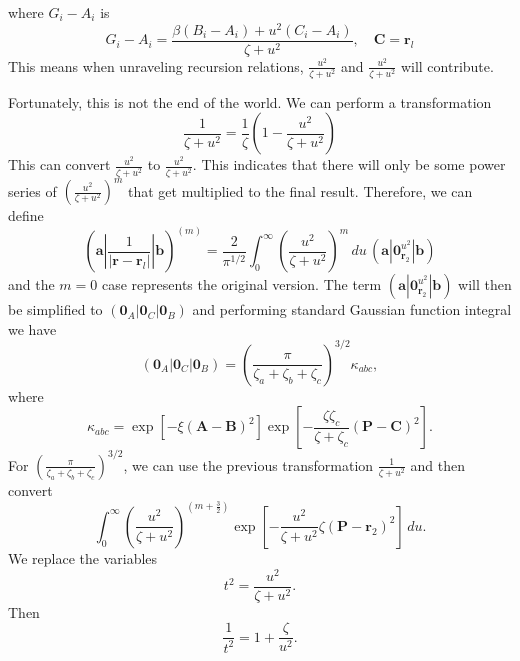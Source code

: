 \documentclass[12pt,a4paper,openany,twoside]{article}
\numberwithin{equation}{section}
\begin{document}
where $G_i-A_i$ is 
\begin{equation}
    G_i - A_i = \frac{\beta (B_i-A_i) + u^2 (C_i - A_i)}{\zeta + u^2}, \quad \boldsymbol{C} = \boldsymbol{r}_l
\end{equation}
This means when unraveling recursion relations, $\frac{u^2}{\zeta+u^2}$ and $\frac{u^2}{\zeta+u^2}$ will contribute.

Fortunately, this is not the end of the world. We can perform a transformation
\begin{equation}
    \frac{1}{\zeta + u^2} = \frac{1}{\zeta} \left(1 - \frac{u^2}{\zeta + u^2}\right)
\end{equation}
This can convert $\frac{u^2}{\zeta+u^2}$ to $\frac{u^2}{\zeta+u^2}$. This indicates that there will only be some power series of $(\frac{u^2}{\zeta+u^2})^m$ that get multiplied to the final result. Therefore, we can define
\begin{equation}
    (\boldsymbol{a} | \frac{1}{|\boldsymbol{r} - \boldsymbol{r}_l|} |\boldsymbol{b} )^{(m)} = \frac{2}{\pi^{1 / 2}} \int_0^\infty \left(\frac{u^2}{\zeta+u^2}\right)^m\, du \, (\boldsymbol{a}|\boldsymbol{0}_{\boldsymbol{r}_2}^{u^2}|\boldsymbol{b})
\end{equation}
and the $m=0$ case represents the original version. The term $(\boldsymbol{a}|\boldsymbol{0}_{\boldsymbol{r}_2}^{u^2}|\boldsymbol{b})$ will then be simplified to $(\boldsymbol{0}_A|\boldsymbol{0}_C|\boldsymbol{0}_B)$ and performing standard Gaussian function integral we have
\begin{equation}
    \left(\boldsymbol{0}_{A}\left|\boldsymbol{0}_{C}\right| \boldsymbol{0}_{B}\right)=\left(\frac{\pi}{\zeta_{a}+\zeta_{b}+\zeta_{c}}\right)^{3 / 2} \kappa_{a b c},
\end{equation}
where
\begin{equation}
    \kappa_{a b c}=\exp \left[-\xi(\boldsymbol{A}-\boldsymbol{B})^{2}\right] \exp \left[-\frac{\zeta \zeta_{c}}{\zeta+\zeta_{c}}(\boldsymbol{P}-\boldsymbol{C})^{2}\right].
\end{equation}
For $\left(\frac{\pi}{\zeta_{a}+\zeta_{b}+\zeta_{c}}\right)^{3 / 2}$, we can use the previous transformation $\frac{1}{\zeta + u^2}$ and then convert
\[
    \int_0^\infty \left(\frac{u^2}{\zeta + u^2}\right)^{(m+\frac{3}{2})}\exp\left[-\frac{u^2}{\zeta + u^2} \zeta (\boldsymbol{P}-\boldsymbol{r}_2)^2\right]\, du.
\]
We replace the variables
\begin{equation}
    t^2 = \frac{u^2}{\zeta + u^2}.
\end{equation}
Then
\begin{equation}
    \frac{1}{t^2} = 1 + \frac{\zeta}{u^2}.
\end{equation}
\end{document}
